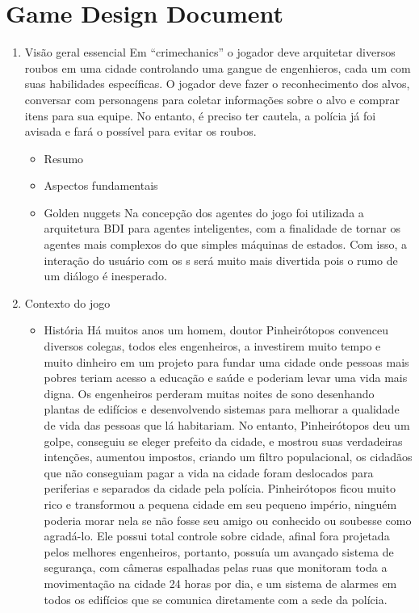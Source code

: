\chapter{Game Design Document}\label{ap:gdd}

\begin{enumerate}
\item Visão geral essencial
Em ``crimechanics'' o jogador deve arquitetar diversos roubos em uma cidade controlando uma gangue de engenhieros, cada um com suas habilidades específicas. O jogador deve fazer o reconhecimento dos alvos, conversar com personagens para coletar informações sobre o alvo e comprar itens para sua equipe. No entanto, é preciso ter cautela, a polícia já foi avisada e fará o possível para evitar os roubos.
\begin{itemize}
\item Resumo
\item Aspectos fundamentais
\item Golden nuggets
Na concepção dos agentes do jogo foi utilizada a arquitetura BDI para agentes inteligentes, com a finalidade de tornar os agentes mais complexos do que simples máquinas de estados. Com isso, a interação do usuário com os \npc{}s será muito mais divertida pois o rumo de um diálogo é inesperado.
\end{itemize}
\item Contexto do jogo
\begin{itemize}
\item História
Há muitos anos um homem, doutor Pinheirótopos convenceu diversos colegas, todos eles engenheiros, a investirem muito tempo e muito dinheiro em um projeto para fundar uma cidade onde pessoas mais pobres teriam acesso a educação e saúde e poderiam levar uma vida mais digna. Os engenheiros perderam muitas noites de sono desenhando plantas de edifícios e desenvolvendo sistemas para melhorar a qualidade de vida das pessoas que lá habitariam. 
No entanto, Pinheirótopos deu um golpe, conseguiu se eleger prefeito da cidade, e mostrou suas verdadeiras intenções, aumentou impostos, criando um filtro populacional, os cidadãos que não conseguiam pagar a vida na cidade foram deslocados para periferias e separados da cidade pela polícia.
Pinheirótopos ficou muito rico e transformou a pequena cidade em seu pequeno império, ninguém poderia morar nela se não fosse seu amigo ou conhecido ou soubesse como agradá-lo. Ele possui total controle sobre cidade, afinal fora projetada pelos melhores engenheiros, portanto, possuía um avançado sistema de segurança, com câmeras espalhadas pelas ruas que monitoram toda a movimentação na cidade 24 horas por dia, e um sistema de alarmes em todos os edifícios que se comunica diretamente com a sede da polícia.

\end{itemize}
\end{enumerate}
